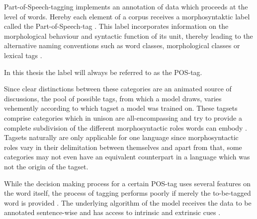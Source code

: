 Part-of-Speech-tagging implements an annotation of data which proceeds at the level of words. Hereby each element of a corpus receives a morphosyntaktic label called the Part-of-Speech-tag \citep{westpfahl2020pos}. 
This label incorporates information on the morphological behaviour and syntactic function of its unit, thereby leading to the alternative naming conventions such as word classes, morphological classes or lexical tags \citep{jurafsky2021}.

In this thesis the label will always be referred to as the POS-tag. 

Since clear distinctions between these categories are an animated source of discussions, the pool of possible tags, from which a model draws, varies vehemently according to which tagset a model was trained on. These tagsets comprise categories which in unison are all-encompassing and try to provide a complete subdivision of the different morphosyntactic roles words can embody \citep{westpfahl2020pos}. 
Tagsets naturally are only applicable for one language since morphosyntactic roles vary in their delimitation between themselves and apart from that, some categories may not even have an equivalent counterpart in a language which was not the origin of the tagset.

While the decision making process for a certain POS-tag uses several features on the word itself, the process of tagging performs poorly if merely the to-be-tagged word is provided \citep{jurafsky2021}. 
The underlying algorithm of the model receives the data to be annotated sentence-wise and has access to intrinsic and extrinsic cues \citep{goldberg2017neural}. 